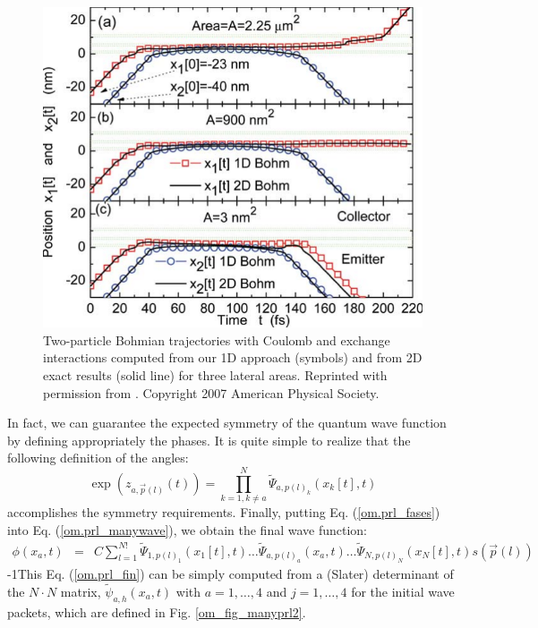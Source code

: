 \documentclass[onecolumn,nofootinbib, secnumarabic, amsmath, nobibnotes,12pt,aps,pra]{revtex4-1}
\newcommand{\fref}[1]{Fig. \ref{#1}}
\newcommand{\eref}[1]{Eq. (\ref{#1})}
\begin{document}
\begin{figure}
\includegraphics{ch1-07.pdf}
\caption{Two-particle Bohmian trajectories with Coulomb and exchange interactions computed from our 1D approach (symbols) and from 2D exact results (solid line) for three lateral areas. Reprinted with permission from \cite{om.oriolsprl}. Copyright 2007 American Physical Society.}
\label{om_fig_prl2}
\end{figure}

In fact, we can guarantee the expected symmetry of the quantum wave
function by defining appropriately the phases. It is quite simple
to realize that the following definition of the angles:
\begin{equation}
\label{om.prl_fases}
 \exp { (z_{a,\vec{p}(l)}(t)) } = \prod^{N}_{k = 1,k\neq a} \tilde \Psi_{a,p(l)_k}(x_k[t],t)
\end{equation}
 accomplishes the symmetry requirements. Finally, putting \eref{om.prl_fases} into \eref{om.prl_manywave}, we obtain the final wave function:
\begin{eqnarray}
\phi(x_a,t) &=& C \sum\limits_{l = 1}^{N!}{{{\tilde{\Psi }}}_{1,
p{{(l)}}_1}}({{x}_{1}}[t],t)\ldots {{{\tilde{\Psi }}}_{a, p{{(l)}}_a}}({{x}_{a}},t)\ldots{{{\tilde{\Psi }}}_{N, p{{(l)}}_N}}{({{x}_{N}}[t],t) s(\vec{p}(l))}
 \label{om.prl_fin}
 \end{eqnarray}
\looseness-1This Eq. (\ref{om.prl_fin}) can be simply computed from a (Slater) determinant of the $N \cdot N$ matrix, $\tilde{\psi}_{a,h}(x_a,t)$ with $a = 1, \ldots , 4$ and $j = 1, \ldots , 4$ for the initial wave packets, which are defined in \fref{om_fig_manyprl2}.
\end{document}

